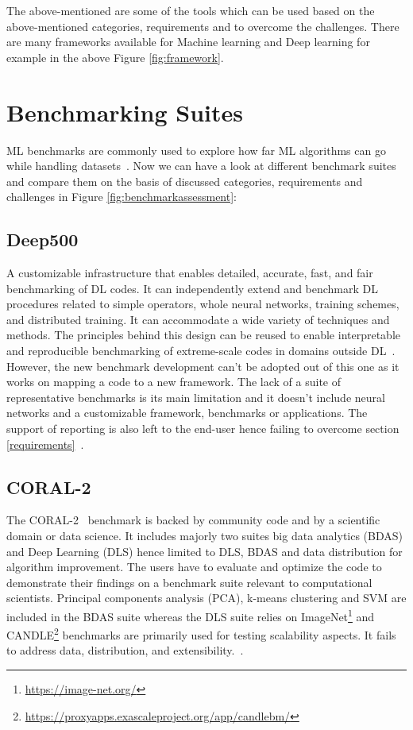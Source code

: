 \documentclass[a4paper,UKenglish,cleveref, autoref, thm-restate]{lipics-v2021}
\begin{document}
    The above-mentioned are some of the tools which can be used based on the above-mentioned categories, requirements and to overcome the challenges.
  There are many frameworks available for Machine learning and Deep learning for example in the above Figure \ref{fig:framework}.

\section{Benchmarking Suites}
\label{benchmarking suites}
ML
benchmarks are commonly used to explore how far ML algorithms can go while
handling datasets~\cite{decodingmlb}.
Now we can have a look at different benchmark suites and compare them on the basis of discussed categories, requirements and challenges in Figure \ref{fig:benchmarkassessment}:
\subsection{Deep500}
\label{Deep500}
    A customizable infrastructure that enables detailed, accurate, fast, and fair benchmarking of DL codes. It can independently extend and benchmark DL procedures related to simple operators, whole neural networks, training schemes, and distributed training. It can accommodate a wide variety of techniques and methods. The principles behind this design can be reused to enable interpretable and reproducible benchmarking of extreme-scale codes in domains outside DL~\cite{deep500}.  However, the new benchmark development can't be adopted out of this one as it works on mapping a code to a new framework. The lack of a suite
of representative benchmarks is its main limitation and it doesn't include neural networks and a customizable framework, benchmarks or applications. The support of reporting is also left to the end-user hence failing to overcome section \ref{requirements}~\cite{sctmlb}.

    \subsection { CORAL-2}
    \label{Coral2}
    The CORAL-2~\cite{RefWorkscoral2} benchmark is backed by community code and by a scientific domain or data science. It includes majorly two suites big data analytics (BDAS) and Deep Learning (DLS) hence limited to DLS, BDAS and data distribution for algorithm improvement. The users have to evaluate and optimize the code to demonstrate their findings on a benchmark suite relevant to computational scientists. Principal components analysis (PCA), k-means clustering and SVM are included in the BDAS suite whereas the DLS suite relies on ImageNet\footnote{\url{https://image-net.org/}} and CANDLE\footnote{\url{https://proxyapps.exascaleproject.org/app/candlebm/}} benchmarks are primarily used for testing scalability aspects. It fails to address data, distribution, and extensibility.~\cite{sctmlb}.
\end{document}
